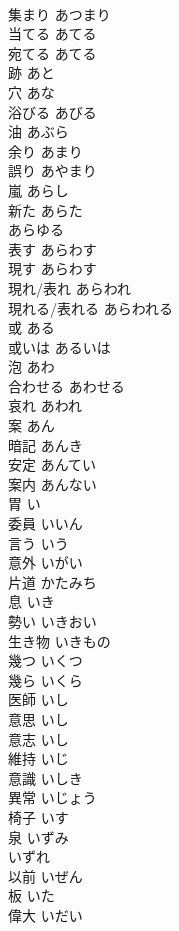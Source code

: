 \documentclass[8pt]{extreport}
\begin{document}
\begin{CJK}{UTF8}{min}
\\	集まり	あつまり	
\\	当てる	あてる	
\\	宛てる	あてる	
\\	跡	あと	
\\	穴	あな	
\\	浴びる	あびる	
\\	油	あぶら	
\\	余り	あまり	
\\	誤り	あやまり	
\\	嵐	あらし	
\\	新た	あらた	
\\	あらゆる		
\\	表す	あらわす	
\\	現す	あらわす	
\\	現れ/表れ	あらわれ	
\\	現れる/表れる	あらわれる	
\\	或	ある	
\\	或いは	あるいは	
\\	泡	あわ	
\\	合わせる	あわせる	
\\	哀れ	あわれ	
\\	案	あん	
\\	暗記	あんき	
\\	安定	あんてい	
\\	案内	あんない	
\\	胃	い	
\\	委員	いいん	
\\	言う	いう	
\\	意外	いがい	
\\	片道	かたみち	
\\	息	いき	
\\	勢い	いきおい	
\\	生き物	いきもの	
\\	幾つ	いくつ	
\\	幾ら	いくら	
\\	医師	いし	
\\	意思	いし	
\\	意志	いし	
\\	維持	いじ	
\\	意識	いしき	
\\	異常	いじょう	
\\	椅子	いす	
\\	泉	いずみ	
\\	いずれ		
\\	以前	いぜん	
\\	板	いた	
\\	偉大	いだい	

\end{CJK}
\end{document}

